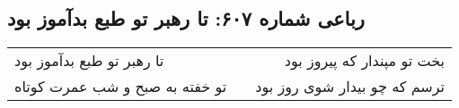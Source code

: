 \begin{center}
\section*{رباعی شماره ۶۰۷: تا رهبر تو طبع بدآموز بود}
\label{sec:0607}
\begin{longtable}{l p{0.5cm} r}
تا رهبر تو طبع بدآموز بود
&&
بخت تو مپندار که پیروز بود
\\
تو خفته به صبح و شب عمرت کوتاه
&&
ترسم که چو بیدار شوی روز بود
\\
\end{longtable}
\end{center}

